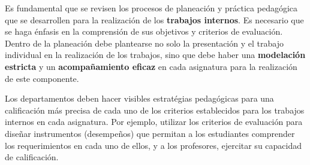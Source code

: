 \documentclass[
  letterpaper,
  DIV=11,
  numbers=noendperiod]{scrartcl}
\begin{document}
\begin{tcolorbox}[enhanced jigsaw, colbacktitle=quarto-callout-warning-color!10!white, toprule=.15mm, colback=white, toptitle=1mm, leftrule=.75mm, rightrule=.15mm, left=2mm, arc=.35mm, colframe=quarto-callout-warning-color-frame, breakable, bottomtitle=1mm, titlerule=0mm, opacityback=0, title=\textcolor{quarto-callout-warning-color}{\faExclamationTriangle}\hspace{0.5em}{Advertencia}, coltitle=black, opacitybacktitle=0.6, bottomrule=.15mm]
Es fundamental que se revisen los procesos de planeación y práctica
pedagógica que se desarrollen para la realización de los
\textbf{trabajos internos}. Es necesario que se haga énfasis en la
comprensión de sus objetivos y criterios de evaluación. Dentro de la
planeación debe plantearse no solo la presentación y el trabajo
individual en la realización de los trabajos, sino que debe haber una
\textbf{modelación estricta} y un \textbf{acompañamiento eficaz} en cada
asignatura para la realización de este componente.

Los departamentos deben hacer visibles estratégias pedagógicas para una
calificación más precisa de cada uno de los criterios establecidos para
los trabajos internos en cada asignatura. Por ejemplo, utilizar los
criterios de evaluación para diseñar instrumentos (desempeños) que
permitan a los estudiantes comprender los requerimientos en cada uno de
ellos, y a los profesores, ejercitar su capacidad de calificación.
\end{tcolorbox}
\end{document}
